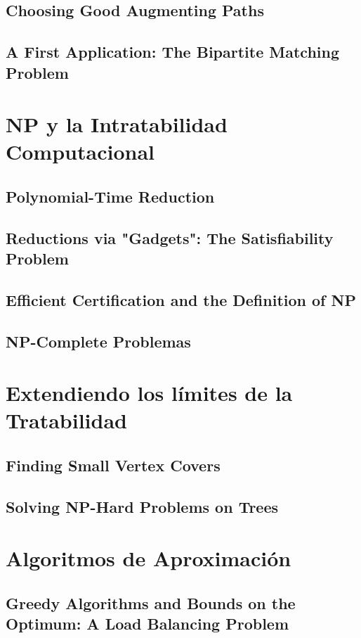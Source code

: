 \documentclass[a4paper, 12pt]{book}
\theoremstyle{dotless}
\begin{document}
\section{Choosing Good Augmenting Paths}

\section{A First Application: The Bipartite Matching Problem}



\chapter{NP y la Intratabilidad Computacional}

\section{Polynomial-Time Reduction}

\section{Reductions via "Gadgets": The Satisfiability Problem}

\section{Efficient Certification and the Definition of NP}

\section{NP-Complete Problemas}





\chapter{Extendiendo los límites de la Tratabilidad}

\section{Finding Small Vertex Covers}

\section{Solving NP-Hard Problems on Trees}




\chapter{Algoritmos de Aproximación}

\section{Greedy Algorithms and Bounds on the Optimum: A Load Balancing Problem}
\end{document}
